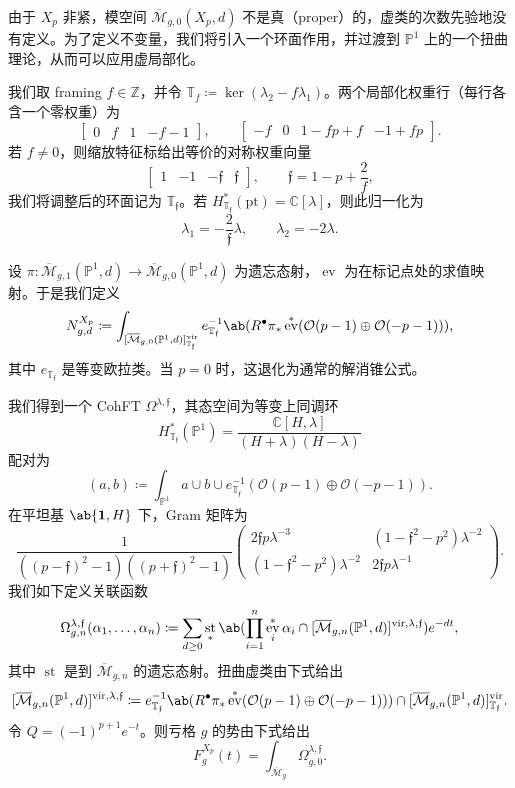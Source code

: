 \documentclass{amsart}
\theoremstyle{definition}
\theoremstyle{remark}
\theoremstyle{plain}
\theoremstyle{definition}
\theoremstyle{remark}
\newcommand{\C}{\mathbb{C}}
\newcommand{\Z}{\mathbb{Z}}
\renewcommand{\P}{\mathbb{P}}
\newcommand{\Mbar}{\overline{\mathcal{M}}}
\newcommand{\mc}[1]{\mathcal{#1}}
\newcommand{\T}{\mathbb{T}}
\newcommand{\mf}[1]{\mathfrak{#1}}
\newcommand{\mr}[1]{\mathrm{#1}}
\newcommand{\1}{\mathbf{1}}
\newcommand{\2}{\mathbf{2}}
\newcommand{\3}{\mathbf{3}}
\newcommand{\vir}{\mr{vir}}
\DeclareMathOperator{\ev}{ev}
\DeclareMathOperator{\st}{st}
\begin{document}
由于 \(X_p\) 非紧，模空间 \(\Mbar_{g,0}(X_p,d)\) 不是真（proper）的，虚类的次数先验地没有定义。为了定义不变量，我们将引入一个环面作用，并过渡到 \(\P^1\) 上的一个扭曲理论，从而可以应用虚局部化。

我们取 framing \(f \in \Z\)，并令 \(\T_f \coloneqq \ker(\lambda_2 - f\lambda_1)\)。两个局部化权重行（每行各含一个零权重）为
\[ \begin{bmatrix} 0 & f & 1 & -f-1 \end{bmatrix}, \qquad \begin{bmatrix} -f & 0 & 1-fp+f & -1+fp \end{bmatrix}. \]
若 \(f \neq 0\)，则缩放特征标给出等价的对称权重向量
\[ \begin{bmatrix} 1 & -1 & -\mf{f} & \mf{f} \end{bmatrix}, \qquad \mf{f} = 1-p+\frac{2}{f}, \]
我们将调整后的环面记为 \(\T_{\mf{f}}\)。若 \(H^*_{\T_{\mf{f}}}(\mr{pt}) = \C[\lambda]\)，则此归一化为
\[ \lambda_1 = -\frac{2}{\mf{f}}\lambda, \qquad \lambda_2 = -2\lambda. \]

设 \(\pi \colon \Mbar_{g,1}(\P^1,d) \to \Mbar_{g,0}(\P^1,d)\) 为遗忘态射，\(\ev\) 为在标记点处的求值映射。于是我们定义
\[ N^{X_p}_{g,d} \coloneqq \int_{[\Mbar_{g,0}(\P^1,d)]^{\vir}_{\T_{\mf{f}}}} e_{\T_{\mf{f}}}^{-1}\ab(R^{\bullet}\pi_* \ev^*(\mc{O}(p-1)\oplus\mc{O}(-p-1))), \]
其中 \(e_{\T_{\mf{f}}}\) 是等变欧拉类。当 \(p=0\) 时，这退化为通常的解消锥公式。

我们得到一个 CohFT \(\Omega^{\lambda,\mf{f}}\)，其态空间为等变上同调环
\[ H^*_{\T_{\mf{f}}}(\P^1) = \frac{\C[H,\lambda]}{(H+\lambda)(H-\lambda)} \]
配对为
\[ (a,b) \coloneqq \int_{\P^1} a \cup b \cup e^{-1}_{\T_{\mf{f}}}(\mc{O}(p-1)\oplus\mc{O}(-p-1)). \]
在平坦基 \(\ab\{\1,H\}\) 下，Gram 矩阵为
\[ \frac{1}{((p-\mf{f})^2-1)((p+\mf{f})^2-1)}\begin{pmatrix} 2\mf{f}p\lambda^{-3} & (1-\mf{f}^2-p^2)\lambda^{-2} \\ (1-\mf{f}^2-p^2)\lambda^{-2} & 2\mf{f}p\lambda^{-1} \end{pmatrix}. \]
我们如下定义关联函数
\[ \Omega^{\lambda,\mf{f}}_{g,n}(\alpha_1,\ldots,\alpha_n) \coloneqq \sum_{d\geq0}\st_*\ab(\prod_{i=1}^n \ev_i^*\alpha_i \cap [\Mbar_{g,n}(\P^1,d)]^{\vir,\lambda,\mf{f}})e^{-dt}, \]
其中 \(\st\) 是到 \(\Mbar_{g,n}\) 的遗忘态射。扭曲虚类由下式给出
\[ [\Mbar_{g,n}(\P^1,d)]^{\vir,\lambda,\mf{f}} \coloneqq e^{-1}_{\T_{\mf{f}}}\ab(R^{\bullet}\pi_*\ev^*(\mc{O}(p-1)\oplus\mc{O}(-p-1))) \cap [\Mbar_{g,n}(\P^1,d)]^{\vir}_{\T_{\mf{f}}}. \]
令 \(Q = (-1)^{p+1}e^{-t}\)。则亏格 \(g\) 的势由下式给出
\[ F^{X_p}_g(t) = \int_{\Mbar_g} \Omega^{\lambda,\mf{f}}_{g,0}. \]
\end{document}
